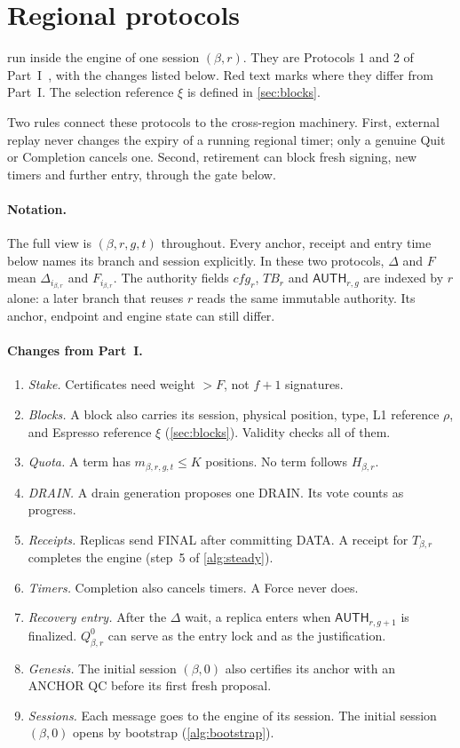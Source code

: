 \documentclass[11pt,a4paper]{article}
\newcommand{\RR}[1]{{\color{rrRed}#1}}
\newcommand{\TB}{\mathit{TB}}
\newcommand{\tagg}[1]{\ensuremath{\mathsf{#1}}}
\newcounter{protocol}
\begin{document}
\section{Regional protocols}
\label{sec:protocols}
 run inside the engine of one session
$(\beta,r)$. They are Protocols 1 and 2 of Part~I~\cite{part1}, with the
changes listed below. \RR{Red text} marks where they differ from Part~I.
The selection reference $\xi$ is defined in \cref{sec:blocks}.

Two rules connect these protocols to the cross-region machinery. First,
external replay never changes the expiry of a running regional timer;
only a genuine Quit or Completion cancels one. Second, retirement can
block fresh signing, new timers and further entry, through the gate
below.

\paragraph{Notation.}
The full view is $(\beta,r,g,t)$ throughout. Every anchor, receipt and
entry time below names its branch and session explicitly. In these two
protocols, $\Delta$ and $F$ mean $\Delta_{i_{\beta,r}}$ and
$F_{i_{\beta,r}}$. The authority fields $\mathit{cfg}_r$, $\TB_r$ and
$\tagg{AUTH}_{r,g}$ are indexed by $r$ alone: a later branch that reuses
$r$ reads the same immutable authority. Its anchor, endpoint and engine
state can still differ.

\paragraph{Changes from Part~I.}
\begin{enumerate}[label=\arabic*.]
\item \emph{Stake.} Certificates need weight $>F$, not $f+1$ signatures.
\item \emph{Blocks.} A block also carries its session, physical
position, type, L1 reference $\rho$, and Espresso reference $\xi$
(\cref{sec:blocks}). Validity checks all of them.
\item \emph{Quota.} A term has $m_{\beta,r,g,t}\le K$ positions. No term
follows $H_{\beta,r}$.
\item \emph{DRAIN.} A drain generation proposes one DRAIN. Its vote
counts as progress.
\item \emph{Receipts.} Replicas send FINAL after committing DATA. A
receipt for $T_{\beta,r}$ completes the engine (step~5 of \cref{alg:steady}).
\item \emph{Timers.} Completion also cancels timers. A Force never does.
\item \emph{Recovery entry.} After the $\Delta$ wait, a replica enters
when $\tagg{AUTH}_{r,g+1}$ is finalized. $Q_{\beta,r}^0$ can serve as the
entry lock and as the justification.
\item \emph{Genesis.} The initial session $(\beta,0)$ also certifies its
anchor with an ANCHOR QC before its first fresh proposal.
\item \emph{Sessions.} Each message goes to the engine of its session.
The initial session $(\beta,0)$ opens by bootstrap (\cref{alg:bootstrap}).
\end{enumerate}
\end{document}
